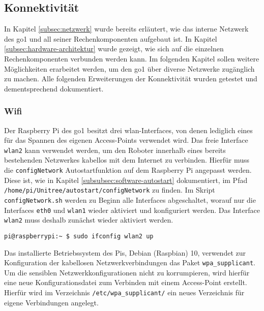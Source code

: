 \subsection{Konnektivität}
\label{subsec:konnektivitat}

In Kapitel \ref{subsec:netzwerk} wurde bereits erläutert, wie das interne Netzwerk des \gls{go1} und all seiner
Rechenkomponenten aufgebaut ist.
In Kapitel \ref{subsec:hardware-architektur} wurde gezeigt, wie sich auf die einzelnen Rechenkomponenten verbunden werden kann.
Im folgenden Kapitel sollen weitere Möglichkeiten erarbeitet werden, um den \gls{go1} über diverse Netzwerke zugänglich zu machen.
Alle folgenden Erweiterungen der Konnektivität wurden getestet und dementsprechend dokumentiert.

\subsubsection*{Wifi}
\label{subsubsec:wifi}

Der Raspberry Pi des \gls{go1} besitzt drei \gls{wlan}-Interfaces, von denen lediglich eines für das Spannen des eigenen
Access-Points verwendet wird.
Das freie Interface \texttt{wlan2} kann verwendet werden, um den Roboter innerhalb eines bereits bestehenden Netzwerkes kabellos
mit dem Internet zu verbinden.
Hierfür muss die \texttt{configNetwork} Autostartfunktion auf dem Raspberry Pi angepasst werden.
Diese ist, wie in Kapitel \ref{subsubsec:software-autostart} dokumentiert, im Pfad
\texttt{/home/\allowbreak pi/\allowbreak Unitree/\allowbreak autostart/\allowbreak configNetwork} zu finden.
Im Skript \texttt{configNetwork.sh} werden zu Beginn alle Interfaces abgeschaltet, worauf nur die Interfaces \texttt{eth0}
und \texttt{wlan1} wieder aktiviert und konfiguriert werden.
Das Interface \texttt{wlan2} muss deshalb zunächst wieder aktiviert werden.

\begin{lstlisting}
pi@raspberrypi:~ $ sudo ifconfig wlan2 up
\end{lstlisting}


Das installierte Betriebssystem des Pis, Debian (Raspbian) \num{10}, verwendet zur Konfiguration der kabellosen Netzwerkverbindungen
das Paket \texttt{wpa\_supplicant}.
Um die sensiblen Netzwerkkonfigurationen nicht zu korrumpieren, wird hierfür eine neue Konfigurationsdatei zum Verbinden
mit einem Access-Point erstellt.
Hierfür wird im Verzeichnis \texttt{/etc/wpa\_supplicant/} ein neues Verzeichnis für eigene Verbindungen angelegt.

